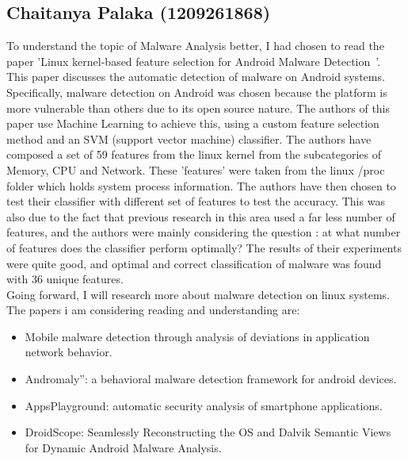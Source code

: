 \documentclass[16pt]{article}
\begin{document}
		\subsection{Chaitanya Palaka (1209261868)}
		To understand the topic of Malware Analysis better, I had chosen to read the paper 'Linux kernel-based feature selection for Android Malware Detection~\cite{kim2014linux}'. This paper discusses the automatic detection of malware on Android systems. Specifically, malware detection on Android was chosen because the platform is more vulnerable than others due to its open source nature. The authors of this paper use Machine Learning to achieve this, using a custom feature selection method and an SVM (support vector machine) classifier. The authors have composed a set of 59 features from the linux kernel from the subcategories of Memory, CPU and Network. These 'features' were taken from the linux /proc folder which holds system process information. The authors have then chosen to test their classifier with different set of features to test the accuracy. This was also due to the fact that previous research in this area used a far less number of features, and the authors were mainly considering the question : at what number of features does the classifier perform optimally? The results of their experiments were quite good, and optimal and correct classification of malware was found with 36 unique features.\\
		
		Going forward, I will research more about malware detection on linux systems. The papers i am considering reading and understanding are:
		\begin{itemize}
			\item Mobile malware detection through analysis of deviations in application network behavior.~\cite{shabtai2014mobile}
			\item Andromaly”: a behavioral malware detection framework for android devices.~\cite{shabtai2012andromaly}
			\item AppsPlayground: automatic security analysis of smartphone applications.~\cite{rastogi2013appsplayground}
			\item DroidScope: Seamlessly Reconstructing the OS and Dalvik Semantic Views for Dynamic Android Malware Analysis.~\cite{yan2012droidscope}
		\end{itemize}
		
\end{document}
